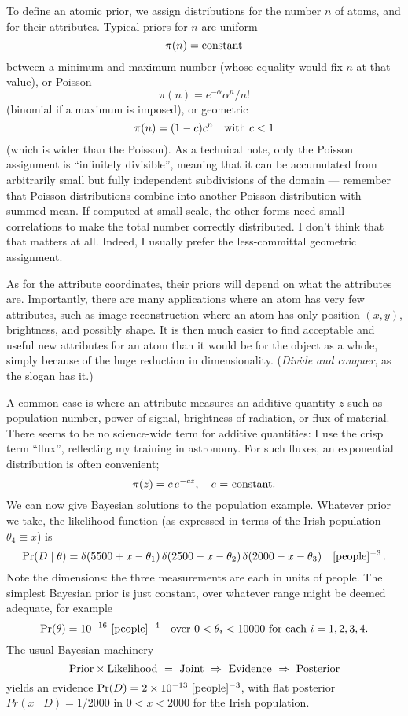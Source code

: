 To define an atomic prior, we assign distributions for the number $n$ of atoms, and for their attributes.  
Typical priors for $n$ are uniform
$$
  \pi(n) = \hbox{constant}
$$
between a minimum and maximum number (whose equality would fix $n$ at that value), or Poisson
$$
  \pi(n) = e^{-\alpha} \alpha^n / n!
$$
(binomial if a maximum is imposed), or geometric
$$
  \pi(n) = (1-c)c^n\quad \hbox{with $c < 1$}
$$
(which is wider than the Poisson).
As a technical note, only the Poisson assignment is ``infinitely divisible'', meaning that it can be accumulated from arbitrarily small but 
fully independent subdivisions of the domain --- remember that Poisson distributions combine into another Poisson distribution with summed mean.  
If computed at small scale, the other forms need small correlations to make the total number correctly distributed.  
I don't think that that matters at all.  
Indeed, I usually prefer the less-committal geometric assignment.

\bigskip
{}
\smallskip

As for the attribute coordinates, their priors will depend on what the attributes are.
Importantly, there are many applications where an atom has very few attributes, 
such as image reconstruction where an atom has only position $(x,y)$, brightness, and possibly shape.
It is then much easier to find acceptable and useful new attributes for an atom than it would be for the object as a whole, 
simply because of the huge reduction in dimensionality.
({\it Divide and conquer}, as the slogan has it.)

A common case is where an attribute measures an additive quantity $z$ such as population number, power of signal, brightness of radiation, or flux of material.
There seems to be no science-wide term for additive quantities: I use the crisp term ``flux'', reflecting my training in astronomy.
For such fluxes, an exponential distribution is often convenient;
$$
  \pi(z) = c\,e^{-cz}, \quad \hbox{$c$ = constant.}
$$
\bigskip
We can now give Bayesian solutions to the population example.
Whatever prior we take, the likelihood function (as expressed in terms of the Irish population $\theta_4 \equiv x$) is
$$
 \Pr(D \mid \theta) = \delta(5500 + x - \theta_1) \,\delta(2500 - x - \theta_2) \,\delta(2000 - x - \theta_3) \quad [{\rm people}]^{-3}\,.
$$
Note the dimensions: the three measurements are each in units of people.
The simplest Bayesian prior is just constant, over whatever range might be deemed adequate, for example
$$
 \Pr(\theta) = 10^{-16}\ [{\rm people}]^{-4} \quad  \hbox{over $0 < \theta_i < 10000$ for each $i=1,2,3,4$.}
$$
The usual Bayesian machinery
$$
 {\rm Prior} \times {\rm Likelihood}\ =\ {\rm Joint}\ \Rightarrow\ {\rm Evidence}\ \Rightarrow\ {\rm Posterior}
$$
yields an evidence $\Pr(D) = 2\times 10^{-13}\ [{\rm people}]^{-3}$,
with flat posterior $Pr(x \mid D) = 1/2000$ in $0 < x < 2000$ for the Irish population.

